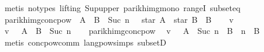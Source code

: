 \begin{isabellebody}
\ {\isacharparenleft}{\kern0pt}metis\ {\isacharparenleft}{\kern0pt}no{\isacharunderscore}{\kern0pt}types{\isacharcomma}{\kern0pt}\ lifting{\isacharparenright}{\kern0pt}\ Sup{\isacharunderscore}{\kern0pt}upper\ parikh{\isacharunderscore}{\kern0pt}img{\isacharunderscore}{\kern0pt}mono\ rangeI\ subset{\isacharunderscore}{\kern0pt}eq{\isacharparenright}{\kern0pt}\isanewline
{}\isamarkupfalse%
%
\endisatagproof
{\isafoldproof}%
%
\isadelimproof
\isanewline
%
\endisadelimproof
\isanewline
{}\isamarkupfalse%
\ parikh{\isacharunderscore}{\kern0pt}img{\isacharunderscore}{\kern0pt}conc{\isacharunderscore}{\kern0pt}pow{}{\isacharcolon}{\kern0pt}\ {\isachardoublequoteopen}{\isasymPsi}\ {\isacharparenleft}{\kern0pt}{\isacharparenleft}{\kern0pt}A\ {\isacharat}{\kern0pt}{\isacharat}{\kern0pt}\ B{\isacharparenright}{\kern0pt}\ {\isacharcircum}{\kern0pt}{\isacharcircum}{\kern0pt}\ Suc\ n{\isacharparenright}{\kern0pt}\ {\isasymsubseteq}\ {\isasymPsi}\ {\isacharparenleft}{\kern0pt}star\ A\ {\isacharat}{\kern0pt}{\isacharat}{\kern0pt}\ star\ B\ {\isacharat}{\kern0pt}{\isacharat}{\kern0pt}\ B{\isacharparenright}{\kern0pt}{\isachardoublequoteclose}\isanewline
%
\isadelimproof
%
\endisadelimproof
%
\isatagproof
{}\isamarkupfalse%
\isanewline
\ \ \isamarkupfalse%
\ v\isanewline
\ \ \isamarkupfalse%
\ {\isachardoublequoteopen}v\ {\isasymin}\ {\isasymPsi}\ {\isacharparenleft}{\kern0pt}{\isacharparenleft}{\kern0pt}A\ {\isacharat}{\kern0pt}{\isacharat}{\kern0pt}\ B{\isacharparenright}{\kern0pt}\ {\isacharcircum}{\kern0pt}{\isacharcircum}{\kern0pt}\ Suc\ n{\isacharparenright}{\kern0pt}{\isachardoublequoteclose}\isanewline
\ \ \isamarkupfalse%
\ parikh{\isacharunderscore}{\kern0pt}img{\isacharunderscore}{\kern0pt}conc{\isacharunderscore}{\kern0pt}pow\ \isamarkupfalse%
\ {\isachardoublequoteopen}v\ {\isasymin}\ {\isasymPsi}\ {\isacharparenleft}{\kern0pt}A\ {\isacharcircum}{\kern0pt}{\isacharcircum}{\kern0pt}\ Suc\ n\ {\isacharat}{\kern0pt}{\isacharat}{\kern0pt}\ B\ {\isacharcircum}{\kern0pt}{\isacharcircum}{\kern0pt}\ n\ {\isacharat}{\kern0pt}{\isacharat}{\kern0pt}\ B{\isacharparenright}{\kern0pt}{\isachardoublequoteclose}\isanewline
\ \ \ \ \isamarkupfalse%
\ {\isacharparenleft}{\kern0pt}metis\ conc{\isacharunderscore}{\kern0pt}pow{\isacharunderscore}{\kern0pt}comm\ lang{\isacharunderscore}{\kern0pt}pow{\isachardot}{\kern0pt}simps{\isacharparenleft}{\kern0pt}{}{\isacharparenright}{\kern0pt}\ subsetD{\isacharparenright}{\kern0pt}\isanewline

\end{isabellebody}
